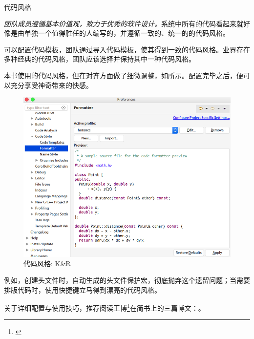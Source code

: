 \begin{content}
\begin{episode}{代码风格}

\begin{content}

\emph{团队成员遵循基本价值观，致力于优秀的软件设计。}系统中所有的代码看起来就好像是由单独一个值得胜任的人编写的，并遵循一致的、统一的的代码风格。

可以配置代码模板，团队通过导入代码模板，使其得到一致的代码风格。业界存在多种经典的代码风格，团队应该选择并保持其中一种代码风格。

\begin{enum}
\end{enum}

本书使用的代码风格，但在对齐方面做了细微调整，如所示。配置完毕之后，便可以充分享受神奇带来的快感。

\begin{figure}[H]
\centering
\includegraphics[width=1.0\textwidth]{figures/xunit/eclipse-formatter.png}
\caption{代码风格: K\&R}
 \label{fig:eclipse-formatter}
\end{figure}

例如，创建头文件时，自动生成的头文件保护宏，彻底抛弃这个遗留问题；当需要排版代码时，使用快捷键立马得到漂亮的代码风格。

关于详细配置与使用技巧，推荐阅读王博\footnote{\href{https://www.jianshu.com/u/92b7d9879f20}{}}在简书上的三篇博文：\href{https://www.jianshu.com/p/dafcdce1f9cb}{}。


\end{content}
\end{episode}
\end{content}
